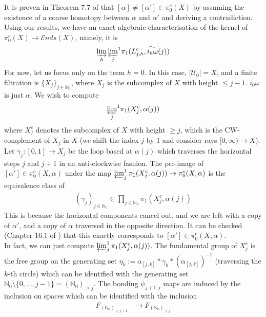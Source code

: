 \documentclass[a4paper,11pt]{article}
\theoremstyle{definition}
\theoremstyle{plain}
\theoremstyle{remark}
\begin{document}
{It is proven in Theorem $7.7$ of \cite{ashley2025interactions} that $[\alpha]\neq [\alpha']\in \pi^c_{0}(X)$ by assuming the existence of a coarse homotopy between $\alpha$ and $\alpha'$ and deriving a contradiction. Using our results, we have an exact algebraic characterisation of the kernel of $\pi^c_{0}(X)\rightarrow \mathcal{E}nds(X)$, namely, it is 
\begin{align*}
\varinjlim_{h} {\varprojlim_{j}}^{1} \pi_{1}(L_{j,h}^c,\widetilde{i_{h}\omega}(j))
\end{align*}
For now, let us focus only on the term $h=0$. In this case, $|\mathcal{U}_{0}| = X$, and a finite filtration is $\{X_{j}\}_{j\in \mathbb{N}_{0}}$, where $X_{j}$ is the subcomplex of $X$ with height $\leq j-1$. $\widetilde{i_{0}\omega}$ is just $\alpha$. We wish to compute
\begin{align*}
{\varprojlim_{j}}^{1} \pi_{1}(X^{c}_{j},\alpha(j))
\end{align*}
where $X^{c}_{j}$ denotes the subcomplex of $X$ with height $\geq j$, which is the CW-complement of $X_{j}$ in $X$ (we shift the index $j$ by $1$ and consider rays $[0,\infty)\rightarrow X$). Let $\gamma_{j}: [0,1]\rightarrow X_{j}$ be the loop based at $\alpha(j)$ which traverses the horizontal steps $j$ and $j+1$ in an anti-clockwise fashion. The pre-image of $[\alpha'] \in \pi^{e}_{0}(X,\alpha)$ under the map  $\varprojlim^1_{j}  \pi_{1}(X^{c}_{j},\alpha(j)) \rightarrow  \pi_{0}^{e}(X,\alpha)$ is the equivalence class of 
\begin{align*}
(\gamma_{j})_{j\in \mathbb{N}_{0}} \in \prod_{j\in \mathbb{N}_{0}} \pi_{1}(X^{c}_{j},\alpha(j))
\end{align*}
This is because the horizontal components cancel out, and we are left with a copy of $\alpha'$, and a copy of $\alpha$ traversed in the opposite direction. It can be checked (Chapter $16.1$ of \cite{geoghegan2007topological}) that this exactly corresponds to $[\alpha'] \in \pi_{0}^{e}(X,\alpha)$. \\

In fact, we can just compute $\varprojlim^1_{j}  \pi_{1}(X^{c}_{j},\alpha(j))$. The fundamental group of $X^{c}_{j}$ is the free group on the generating set $\eta_{k}:= \alpha_{[j,k]} \ast \gamma_{k} \ast (\alpha_{[j,k]})^{-1}$ (traversing the $k$-th circle) which can be identified with the generating set $\mathbb{N}_{0}\setminus \{0,\dots, j-1\} = (\mathbb{N}_{0})_{\geq j}$. The bonding $\psi_{j+1,j}$ maps are induced by the inclusion on spaces which can be identified with the inclusion  
\begin{align*}
F_{(\mathbb{N}_{0})_{\geq j+1}} &\rightarrow F_{(\mathbb{N}_{0})_{\geq j}}
\end{align*}

}
\end{document}
